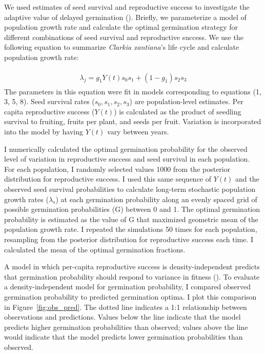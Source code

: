 \documentclass[12pt, oneside, titlepage]{article}   	%
\begin{document}
We used estimates of seed survival and reproductive success to investigate the adaptive value of delayed germination (\cite{gremer2014}). Briefly, we parameterize a model of population growth rate and calculate the optimal germination strategy for different combinations of seed survival and reproductive success. We use the following equation to summarize \textit{Clarkia xantiana}'s life cycle and calculate population growth rate:

\begin{align}
  \begin{split}
\lambda_{j} = g_1 Y(t) s_0 s_1 + (1-g_1) s_2 s_3 
  \end{split}
\end{align}
%
The parameters in this equation were fit in models corresponding to equations (1, 3, 5, 8). Seed survival rates ($s_0, s_1, s_2, s_3$) are population-level estimates. Per capita reproductive success ($Y(t)$) is calculated as the product of seedling survival to fruiting, fruits per plant, and seeds per fruit. Variation is incorporated into the model by having $Y(t)$ vary between years.

I numerically calculated the optimal germination probability for the observed level of variation in reproductive success and seed survival in each population. For each population, I randomly selected values 1000 from the posterior distribution for reproductive success. I used this same sequence of $Y(t)$ and the observed seed survival probabilities to calculate long-term stochastic population growth rates ($\lambda_s$) at each germination probability along an evenly spaced grid of possible germination probabilities (G) between 0 and 1. The optimal germination probability is estimated as the value of G that maximized geometric mean of the population growth rate. I repeated the simulations 50 times for each population, resampling from the posterior distribution for reproductive success each time. I calculated the mean of the optimal germination fractions. 

A model in which per-capita reproductive success is density-independent predicts that germination probability should respond to variance in fitness (\cite{cohen1966}). To evaluate a density-independent model for germination probability, I compared observed germination probability to predicted germination optima. I plot this comparison in Figure~\ref{fig:obs_pred}. The dotted line indicates a 1:1 relationship between observations and predictions. Values below the line indicate that the model predicts higher germination probabilities than observed; values above the line would indicate that the model predicts lower germination probabilities than observed.
\end{document}
